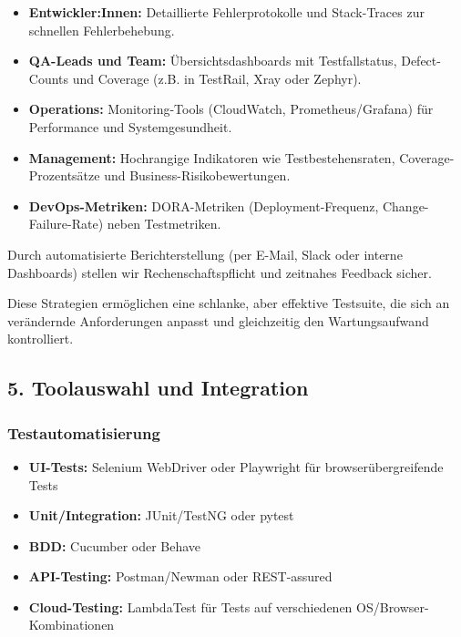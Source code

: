 \begin{itemize}
    \item \textbf{Entwickler:Innen:} Detaillierte Fehlerprotokolle und Stack-Traces zur schnellen
    Fehlerbehebung.
    \item \textbf{QA-Leads und Team:} Übersichtsdashboards mit Testfallstatus, Defect-Counts und
    Coverage (z.B. in TestRail, Xray oder Zephyr).
    \item \textbf{Operations:} Monitoring-Tools (CloudWatch, Prometheus/Grafana) für Performance
    und Systemgesundheit.
    \item \textbf{Management:} Hochrangige Indikatoren wie Testbestehensraten, Coverage-Prozentsätze
    und Business-Risikobewertungen.
    \item \textbf{DevOps-Metriken:} DORA-Metriken (Deployment-Frequenz, Change-Failure-Rate) neben
    Testmetriken.
\end{itemize}

Durch automatisierte Berichterstellung (per E-Mail, Slack oder interne Dashboards) stellen wir
Rechenschaftspflicht und zeitnahes Feedback sicher.

Diese Strategien ermöglichen eine schlanke, aber effektive Testsuite, die sich an verändernde
Anforderungen anpasst und gleichzeitig den Wartungsaufwand kontrolliert.

\subsection{5. Toolauswahl und Integration}
\subsubsection{Testautomatisierung}

\begin{itemize}
    \item \textbf{UI-Tests:}  Selenium WebDriver oder Playwright für browserübergreifende Tests
    \item \textbf{Unit/Integration:} JUnit/TestNG oder pytest
    \item \textbf{BDD:} Cucumber oder Behave
    \item \textbf{API-Testing:} Postman/Newman oder REST-assured
    \item \textbf{Cloud-Testing:} LambdaTest für Tests auf verschiedenen OS/Browser-Kombinationen
\end{itemize}

